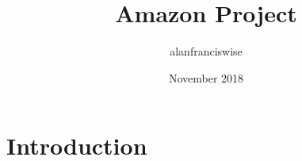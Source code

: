 \documentclass{article}
\title{Amazon Project}
\author{alanfranciswise }
\date{November 2018}
\begin{document}
\maketitle

\section{Introduction}
\end{document}
